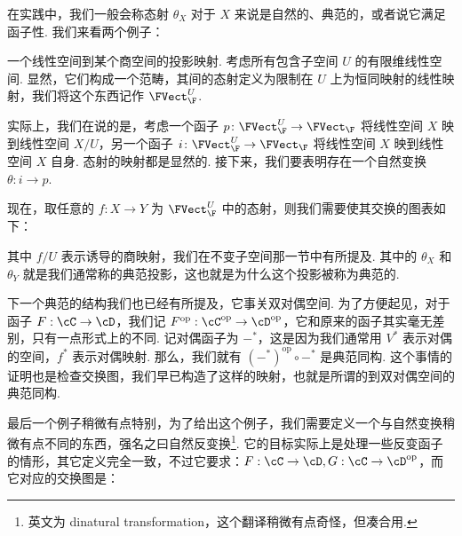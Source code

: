 在实践中，我们一般会称态射 $\theta_X$ 对于 $X$ 来说是自然的、典范的，或者说它满足函子性. 我们来看两个例子：

\begin{example}{}{}
    一个线性空间到某个商空间的投影映射. 考虑所有包含子空间 $U$ 的有限维线性空间. 显然，它们构成一个范畴，其间的态射定义为限制在 $U$ 上为恒同映射的线性映射，我们将这个东西记作 $\FVect_\F^U$.

    实际上，我们在说的是，考虑一个函子 $p\colon \FVect_\F^U \to \FVect_\F$ 将线性空间 $X$ 映到线性空间 $X/U$，另一个函子 $i\colon \FVect_\F^U \to \FVect_\F$ 将线性空间 $X$ 映到线性空间 $X$ 自身. 态射的映射都是显然的. 接下来，我们要表明存在一个自然变换 $\theta: i \to p$.

    现在，取任意的 $f\colon X \to Y$ 为 $\FVect_\F^U$ 中的态射，则我们需要使其交换的图表如下：

    \begin{center}
    \end{center}

    其中 $f/U$ 表示诱导的商映射，我们在不变子空间那一节中有所提及. 其中的 $\theta_X$ 和 $\theta_Y$ 就是我们通常称的典范投影，这也就是为什么这个投影被称为典范的.
\end{example}

下一个典范的结构我们也已经有所提及，它事关双对偶空间. 为了方便起见，对于函子 $F: \cC \to \cD$，我们记 $F^\mathrm{op}: \cC^\mathrm{op} \to \cD^\mathrm{op}$，它和原来的函子其实毫无差别，只有一点形式上的不同. 记对偶函子为 $-^*$，这是因为我们通常用 $V^*$ 表示对偶的空间，$f^*$ 表示对偶映射. 那么，我们就有 $(-^*)^\mathrm{op} \circ -^*$ 是典范同构. 这个事情的证明也是检查交换图，我们早已构造了这样的映射，也就是所谓的到双对偶空间的典范同构.

最后一个例子稍微有点特别，为了给出这个例子，我们需要定义一个与自然变换稍微有点不同的东西，强名之曰自然反变换\footnote{英文为 dinatural transformation，这个翻译稍微有点奇怪，但凑合用. }. 它的目标实际上是处理一些反变函子的情形，其它定义完全一致，不过它要求：$F: \cC \to \cD, G: \cC \to \cD^\mathrm{op}$，而它对应的交换图是：

\begin{center}
\end{center}

